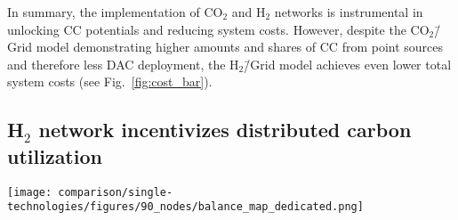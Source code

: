 \documentclass[twocolumn]{article}
\newcommand{\COtwo}{CO$_2$}
\newcommand{\Htwo}{H$_2$}
\newcommand{\modCO}{CO$_2$\=/Grid model}
\newcommand{\modH}{H$_2$\=/Grid model}
\newcommand{\carbon}{CO$_2$}
\newcommand{\hydrogen}{H$_2$}
\newcommand{\carbonmodel}{CO$_2$\=/Grid model}
\newcommand{\hydrogenmodel}{H$_2$\=/Grid model}
\begin{document}
In summary, the implementation of \COtwo{} and \Htwo{} networks is instrumental in unlocking CC potentials and reducing system costs. However, despite the \modCO{} demonstrating higher amounts and shares of CC from point sources and therefore less DAC deployment, the \modH{} achieves even  lower total system costs (see Fig.~\ref{fig:cost_bar}).


\subsection*{\Htwo{} network incentivizes distributed carbon utilization}\label{subsec:H2}

\begin{figure*}[ht!]
    \centering
    \texttt{[image: comparison/single-technologies/figures/90\_nodes/balance\_map\_dedicated.png]}
    \caption{Optimal production, consumption, flows and prices of the carbon (top line) and hydrogen (bottom line) sectors for the \carbonmodel{} (left) and the \hydrogenmodel{} (right) in the net zero scenario. For each region, upper semicircles show the average production per technology, lower semicircles the consumption, and colors the average marginal prices. Lines and arrows show the interregional transportation. Carbon sequestration offshore are drawn as full circles. \carbon{} and \hydrogen{} transport goes from low price to high price areas to supply CU and, in the case of \carbonmodel{}, CS.
    }
    \label{fig:balance_map}
\end{figure*}
\end{document}
